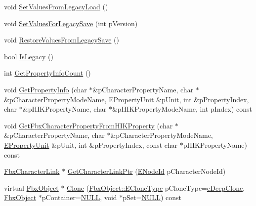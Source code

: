 \begin{DoxyCompactItemize}
void \hyperlink{class_fbx_character_a17b63d788b3105cc2322e6841e5b5c3b}{Set\+Values\+From\+Legacy\+Load} ()
\item 
void \hyperlink{class_fbx_character_ae9095a29e0f3f141abe8a9107de87a69}{Set\+Values\+For\+Legacy\+Save} (int p\+Version)
\item 
void \hyperlink{class_fbx_character_a3530f7289a38b392b9cff0e084e94ff7}{Restore\+Values\+From\+Legacy\+Save} ()
\item 
bool \hyperlink{class_fbx_character_abdabb0d27c98299f041fb9b6344aad50}{Is\+Legacy} ()
\item 
int \hyperlink{class_fbx_character_a4d3213a482478fa8c8ad242dc76e9e96}{Get\+Property\+Info\+Count} ()
\item 
void \hyperlink{class_fbx_character_a49f3d9530d72a1ab268aa500ef64ac3e}{Get\+Property\+Info} (char $\ast$\&p\+Character\+Property\+Name, char $\ast$\&p\+Character\+Property\+Mode\+Name, \hyperlink{class_fbx_character_aa48fb13a1c63e6a69ce9fa251993f8d5}{E\+Property\+Unit} \&p\+Unit, int \&p\+Property\+Index, char $\ast$\&p\+H\+I\+K\+Property\+Name, char $\ast$\&p\+H\+I\+K\+Property\+Mode\+Name, int p\+Index) const
\item 
void \hyperlink{class_fbx_character_ad3a3779b2dfcb1fbb3b962441715e059}{Get\+Fbx\+Character\+Property\+From\+H\+I\+K\+Property} (char $\ast$\&p\+Character\+Property\+Name, char $\ast$\&p\+Character\+Property\+Mode\+Name, \hyperlink{class_fbx_character_aa48fb13a1c63e6a69ce9fa251993f8d5}{E\+Property\+Unit} \&p\+Unit, int \&p\+Property\+Index, const char $\ast$p\+H\+I\+K\+Property\+Name) const
\item 
\hyperlink{class_fbx_character_link}{Fbx\+Character\+Link} $\ast$ \hyperlink{class_fbx_character_a4973b648e1127a4d2e22f226b908d272}{Get\+Character\+Link\+Ptr} (\hyperlink{class_fbx_character_ad75bf42026e435ac0ff4d7ece2317be4}{E\+Node\+Id} p\+Character\+Node\+Id)
\item 
virtual \hyperlink{class_fbx_object}{Fbx\+Object} $\ast$ \hyperlink{class_fbx_character_a6aba29e5583b547aae493d3b79a74ac2}{Clone} (\hyperlink{class_fbx_object_a9f5626b2d2135684d6ea1e6e4ad2acbb}{Fbx\+Object\+::\+E\+Clone\+Type} p\+Clone\+Type=\hyperlink{class_fbx_object_a9f5626b2d2135684d6ea1e6e4ad2acbbaacdf137ca059c572798287e98c4236d0}{e\+Deep\+Clone}, \hyperlink{class_fbx_object}{Fbx\+Object} $\ast$p\+Container=\hyperlink{fbxarch_8h_a070d2ce7b6bb7e5c05602aa8c308d0c4}{N\+U\+LL}, void $\ast$p\+Set=\hyperlink{fbxarch_8h_a070d2ce7b6bb7e5c05602aa8c308d0c4}{N\+U\+LL}) const
\end{DoxyCompactItemize}
